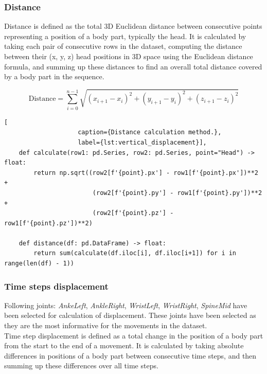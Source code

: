             \subsubsection{Distance}

                Distance is defined as the total 3D Euclidean distance between consecutive points representing a position of a body part, typically the head. It is calculated by taking each pair of consecutive rows in the dataset, computing the distance between their (x, y, z) head positions in 3D space using the Euclidean distance formula, and summing up these distances to find an overall total distance covered by a body part in the sequence.

                \begin{equation}
                    \text{Distance} = \sum_{i=0}^{n-1} \sqrt{(x_{i+1} - x_i)^2 + (y_{i+1} - y_i)^2 + (z_{i+1} - z_i)^2}
                \end{equation}

                \begin{lstlisting}[
                    caption={Distance calculation method.}, 
                    label={lst:vertical_displacement}],     
    def calculate(row1: pd.Series, row2: pd.Series, point="Head") -> float:
        return np.sqrt((row2[f'{point}.px'] - row1[f'{point}.px'])**2 +
                        (row2[f'{point}.py'] - row1[f'{point}.py'])**2 +
                        (row2[f'{point}.pz'] - row1[f'{point}.pz'])**2)
    
    def distance(df: pd.DataFrame) -> float:
        return sum(calculate(df.iloc[i], df.iloc[i+1]) for i in range(len(df) - 1))
                \end{lstlisting}
            \subsubsection{Time steps displacement}
                Following joints: \textit{AnkeLeft}, \textit{AnkleRight}, \textit{WristLeft}, \textit{WristRight}, \textit{SpineMid} have been selected for calculation of displacement. These joints have been selected as they are the most informative for the movements in the dataset. \\

                Time step displacement is defined as a total change in the position of a body part from the start to the end of a movement. It is calculated by taking absolute differences in positions of a body part between consecutive time steps, and then summing up these differences over all time steps.

